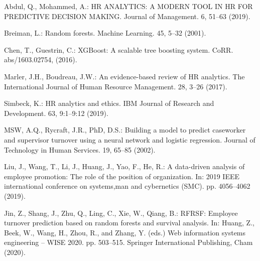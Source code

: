 \documentclass[runningheads]{llncs}
\begin{document}
\begin{thebibliography}{8}
{Abdul, Q., Mohammed, A.: HR ANALYTICS: A MODERN TOOL IN
HR FOR PREDICTIVE DECISION MAKING. Journal of Management. 6, 51--63
(2019).}

{Breiman, L.: Random forests. Machine Learning. 45, 5--32
(2001).}

{Chen, T., Guestrin, C.: XGBoost: {A} scalable tree
boosting system. CoRR. abs/1603.02754, (2016).}

{Marler, J.H., Boudreau, J.W.: An evidence-based review
of HR analytics. The International Journal of Human Resource Management.
28, 3--26 (2017).}

{Simbeck, K.: HR analytics and ethics. IBM Journal of
Research and Development. 63, 9:1--9:12 (2019).}

{MSW, A.Q., Rycraft, J.R., PhD, D.S.: Building a model to
predict caseworker and supervisor turnover using a neural network and
logistic regression. Journal of Technology in Human Services. 19, 65--85
(2002).}

{Liu, J., Wang, T., Li, J., Huang, J., Yao, F., He, R.: A
data-driven analysis of employee promotion: The role of the position of
organization. In: 2019 IEEE international conference on systems,man and
cybernetics (SMC). pp. 4056--4062 (2019).}

{Jin, Z., Shang, J., Zhu, Q., Ling, C., Xie, W., Qiang,
B.: RFRSF: Employee turnover prediction based on random forests and
survival analysis. In: Huang, Z., Beek, W., Wang, H., Zhou, R., and
Zhang, Y. (eds.) Web information systems engineering -- WISE 2020. pp.
503--515. Springer International Publishing, Cham (2020).}

\end{thebibliography}
\end{document}
